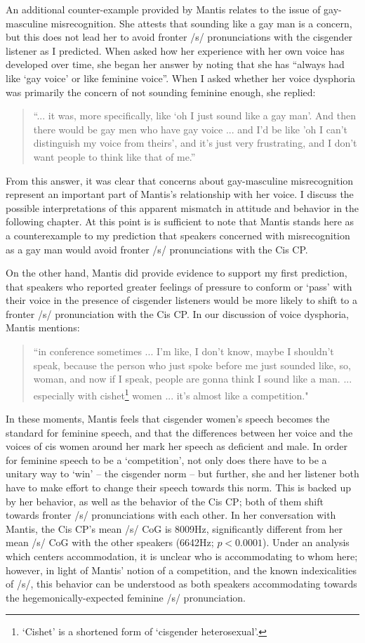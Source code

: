 \documentclass[12pt,twoside]{reedthesis}
\begin{document}
An additional counter-example provided by Mantis relates to the issue of gay-masculine misrecognition. She attests that sounding like a gay man is a concern, but this does not lead her to avoid fronter /s/ pronunciations with the cisgender listener as I predicted. When asked how her experience with her own voice has developed over time, she began her answer by noting that she has ``always had like `gay voice' or like feminine voice''. When I asked whether her voice dysphoria was primarily the concern of not sounding feminine enough, she replied:
\begin{quote}
 ``... it was, more specifically, like `oh I just sound like a gay man'. And then there would be gay men who have gay voice ... and I'd be like 'oh I can't distinguish my voice from theirs', and it's just very frustrating, and I don't want people to think like that of me.''
\end{quote}
From this answer, it was clear that concerns about gay-masculine misrecognition represent an important part of Mantis's relationship with her voice. I discuss the possible interpretations of this apparent mismatch in attitude and behavior in the following chapter. At this point is is sufficient to note that Mantis stands here as a counterexample to my prediction that speakers concerned with misrecognition as a gay man would avoid fronter /s/ pronunciations with the Cis CP.

On the other hand, Mantis did provide evidence to support my first prediction, that speakers who reported greater feelings of pressure to conform or `pass' with their voice in the presence of cisgender listeners would be more likely to shift to a fronter /s/ pronunciation with the Cis CP. In our discussion of voice dysphoria, Mantis mentions:
\begin{quote}
 ``in conference sometimes ... I'm like, I don't know, maybe I shouldn't speak, because the person who just spoke before me just sounded like, so, woman, and now if I speak, people are gonna think I sound like a man. ... especially with cishet\footnote{`Cishet' is a shortened form of `cisgender heterosexual'.} women ... it’s almost like a competition."
\end{quote}
In these moments, Mantis feels that cisgender women's speech becomes the standard for feminine speech, and that the differences between her voice and the voices of cis women around her mark her speech as deficient and male. In order for feminine speech to be a `competition', not only does there have to be a unitary way to `win' -- the cisgender norm -- but further, she and her listener both have to make effort to change their speech towards this norm. This is backed up by her behavior, as well as the behavior of the Cis CP; both of them shift towards fronter /s/ pronunciations with each other. In her conversation with Mantis, the Cis CP's mean /s/ CoG is 8009Hz, significantly different from her mean /s/ CoG with the other speakers (6642Hz; $p < 0.0001$). Under an analysis which centers accommodation, it is unclear who is accommodating to whom here; however, in light of Mantis' notion of a competition, and the known indexicalities of /s/, this behavior can be understood as both speakers accommodating towards the hegemonically-expected feminine /s/ pronunciation.
\end{document}
